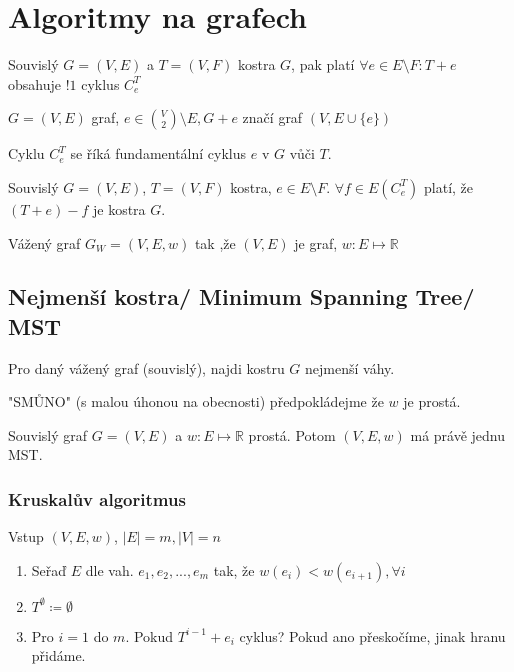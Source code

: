\documentclass[../main.tex]{subfiles}
\begin{document}
\section{Algoritmy na grafech}

\begin{remark}
    Souvislý $G=(V,E)$ a $T=(V,F)$ kostra $G$, pak platí
    $\forall e \in E\setminus F: T + e$ obsahuje $!1$ cyklus $C_e^T$
\end{remark}

\begin{definition}
    $G=(V,E)$ graf, $e\in\binom{V}{2}\setminus E, G+e$ značí graf
    $(V, E\cup \{ e\})$
\end{definition}

\begin{definition}
    Cyklu $C_e^T$ se říká fundamentální cyklus $e$ v $G$
    vůči $T$.
\end{definition}

\begin{remark}
    Souvislý $G=(V,E)$, $T=(V,F)$ kostra, $e\in E\setminus F$.
    $\forall f \in E(C_e^T)$ platí, že $(T+e)-f$ je kostra $G$.
\end{remark}


\begin{definition}
    Vážený graf $G_W = (V,E,w)$ tak ,že  $(V,E)$ je graf, $w: E\mapsto \mathbb{R}$
\end{definition}

\subsection{Nejmenší kostra/ Minimum Spanning Tree/ MST}
Pro daný vážený graf (souvislý), najdi kostru $G$ nejmenší váhy.

"SMŮNO" (s malou úhonou na obecnosti) předpokládejme že $w$ je prostá.

\begin{claim}
    Souvislý graf $G= (V,E)$ a $w: E\mapsto \mathbb{R}$ prostá.
    Potom $(V,E,w)$ má právě jednu MST. 
\end{claim}

\subsubsection*{Kruskalův algoritmus}
Vstup $(V,E,w)$, $|E|=m, |V|=n$
\begin{enumerate}
    \item Seřaď $E$ dle vah. $e_1, e_2,...,e_m$ tak, že $w(e_i) < w(e_{i+1}), \forall i$
    \item $T^\emptyset \coloneq \emptyset$
    \item Pro $i=1$ do $m$. Pokud $T^{i-1} + e_i$ cyklus? Pokud ano přeskočíme,  jinak hranu přidáme.
\end{enumerate}
\end{document}
